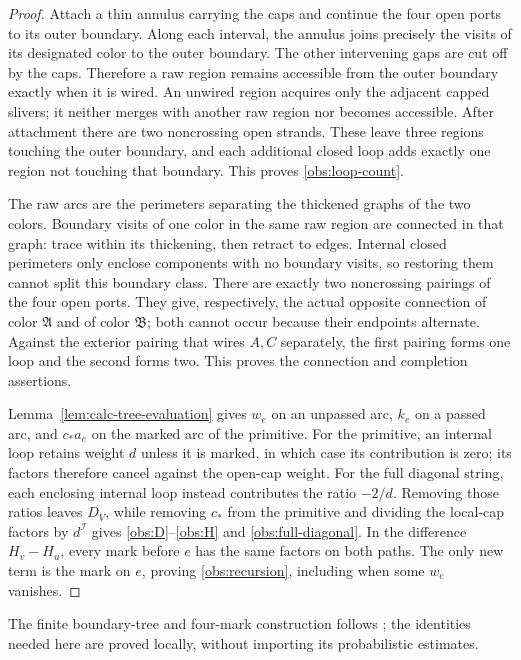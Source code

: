 \begin{proof}
Attach a thin annulus carrying the caps and continue the four open
ports to its outer boundary.  Along each interval, the annulus joins
precisely the visits of its designated color to the outer boundary.
The other intervening gaps are cut off by the caps.  Therefore a raw
region remains accessible from the outer boundary exactly when it is
wired.  An unwired region acquires only the adjacent capped slivers;
it neither merges with another raw region nor becomes accessible.
After attachment there are two noncrossing open strands.  These leave
three regions touching the outer boundary, and each additional closed
loop adds exactly one region not touching that boundary.  This proves
\eqref{obs:loop-count}.

The raw arcs are the perimeters separating the thickened graphs of the
two colors.  Boundary visits of one color in the same raw region are
connected in that graph: trace within its thickening, then retract to
edges.  Internal closed perimeters only enclose components with no
boundary visits, so restoring them cannot split this boundary class.
There are exactly two noncrossing pairings of the four open ports.
They give, respectively, the actual opposite connection of color
$\mathfrak A$ and of color $\mathfrak B$; both cannot occur because
their endpoints alternate.  Against the exterior pairing that wires
$A,C$ separately, the first pairing forms one loop and the second
forms two.  This proves the connection and completion assertions.

Lemma~\ref{lem:calc-tree-evaluation} gives $w_e$ on an unpassed arc,
$k_e$ on a passed arc, and $c_*a_e$ on the marked arc of the primitive.
For the primitive, an internal loop retains weight $d$ unless it is
marked, in which case its contribution is zero; its factors therefore
cancel against the open-cap weight.  For the full diagonal string,
each enclosing internal loop instead contributes the ratio $-2/d$.
Removing those ratios leaves $D_V$, while removing $c_*$ from the
primitive and dividing the local-cap factors by $d^{\mathcal I}$ gives
\eqref{obs:D}--\eqref{obs:H} and \eqref{obs:full-diagonal}.  In the
difference $H_v-H_u$, every
mark before $e$ has the same factors on both paths.  The only new term
is the mark on $e$, proving \eqref{obs:recursion}, including when some
$w_e$ vanishes.
\end{proof}

The finite boundary-tree and four-mark construction follows
\cite{OpenAIConformalLimits2026}; the identities needed here are proved
locally, without importing its probabilistic estimates.

